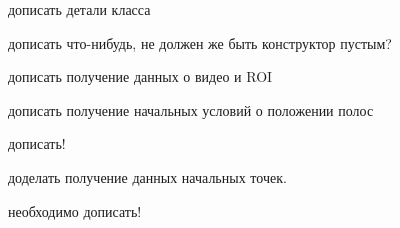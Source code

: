 
\begin{DoxyRefList}
\item[\label{todo__todo000004}%
\hypertarget{todo__todo000004}{}%
Class \hyperlink{class_controller}{Controller} ]дописать детали класса  
\item[\label{todo__todo000001}%
\hypertarget{todo__todo000001}{}%
Member \hyperlink{class_controller_a95c56822d667e94b031451729ce069a9}{Controller\+:\+:Controller} ()]дописать что-\/нибудь, не должен же быть конструктор пустым?  
\item[\label{todo__todo000002}%
\hypertarget{todo__todo000002}{}%
Member \hyperlink{class_controller_ad535ad74055e645b7f44b7feeb4e82a8}{Controller\+:\+:start} ()]дописать получение данных о видео и R\+O\+I 

дописать получение начальных условий о положении полос  
\item[\label{todo__todo000005}%
\hypertarget{todo__todo000005}{}%
Member \hyperlink{class_controller_a0ab87934c4f7a266cfdb86e0f36bc1b5}{Controller\+:\+:$\sim$\+Controller} ()]дописать!  
\item[\label{todo__todo000006}%
\hypertarget{todo__todo000006}{}%
Member \hyperlink{class_input_data_aff34c47ca0f425fb36c988f0e827a525}{Input\+Data\+:\+:Input\+Data} ()]доделать получение данных начальных точек.  
\item[\label{todo__todo000021}%
\hypertarget{todo__todo000021}{}%
Member \hyperlink{class_line_detector_a556657ccf8bd36178c99ad92bcec5a97}{Line\+Detector\+:\+:$\sim$\+Line\+Detector} ()]необходимо дописать! 
\end{DoxyRefList}